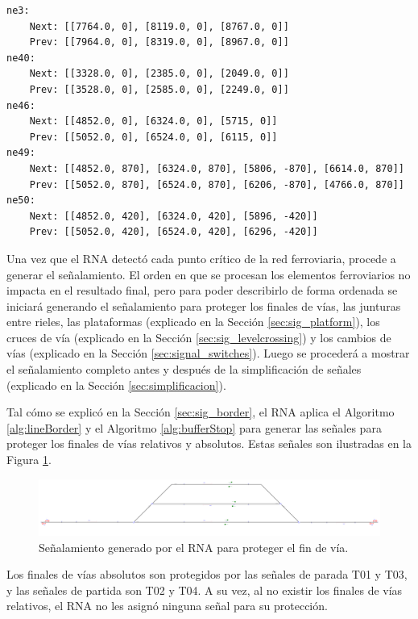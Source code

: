 	\begin{lstlisting}[language = {}, caption = SafePoints.RNA, label = {lst:EJ9_5}]
ne3:
	Next: [[7764.0, 0], [8119.0, 0], [8767.0, 0]]
	Prev: [[7964.0, 0], [8319.0, 0], [8967.0, 0]]
ne40:
	Next: [[3328.0, 0], [2385.0, 0], [2049.0, 0]]
	Prev: [[3528.0, 0], [2585.0, 0], [2249.0, 0]]
ne46:
	Next: [[4852.0, 0], [6324.0, 0], [5715, 0]]
	Prev: [[5052.0, 0], [6524.0, 0], [6115, 0]]
ne49:
	Next: [[4852.0, 870], [6324.0, 870], [5806, -870], [6614.0, 870]]
	Prev: [[5052.0, 870], [6524.0, 870], [6206, -870], [4766.0, 870]]
ne50:
	Next: [[4852.0, 420], [6324.0, 420], [5896, -420]]
	Prev: [[5052.0, 420], [6524.0, 420], [6296, -420]]
	\end{lstlisting}	
	
	Una vez que el RNA detectó cada punto crítico de la red ferroviaria, procede a generar el señalamiento. El orden en que se procesan los elementos ferroviarios no impacta en el resultado final, pero para poder describirlo de forma ordenada se iniciará generando el señalamiento para proteger los finales de vías, las junturas entre rieles, las plataformas (explicado en la Sección \ref{sec:sig_platform}), los cruces de vía (explicado en la Sección \ref{sec:sig_levelcrossing}) y los cambios de vías (explicado en la Sección \ref{sec:signal_switches}). Luego se procederá a mostrar el señalamiento completo antes y después de la simplificación de señales (explicado en la Sección \ref{sec:simplificacion}). 
	
	Tal cómo se explicó en la Sección \ref{sec:sig_border}, el RNA aplica el Algoritmo \ref{alg:lineBorder} y el Algoritmo \ref{alg:bufferStop} para generar las señales para proteger los finales de vías relativos y absolutos. Estas señales son ilustradas en la Figura \ref{fig:EJ9_3}.

	\begin{figure}[H]
		\centering
		\includegraphics[width=1\textwidth]{resultados-obtenidos/ejemplo9/images/9_step1.png}
		\centering\caption{Señalamiento generado por el RNA para proteger el fin de vía.}
		\label{fig:EJ9_3}
	\end{figure}

	Los finales de vías absolutos son protegidos por las señales de parada T01 y T03, y las señales de partida son T02 y T04. A su vez, al no existir los finales de vías relativos, el RNA no les asignó ninguna señal para su protección.

